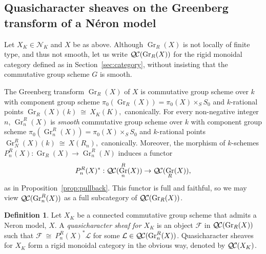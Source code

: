 \documentclass{amsart}
\theoremstyle{plain}
\theoremstyle{definition}
\newtheorem{definition}[theorem]{Definition}
\theoremstyle{remark}
\newcommand{\Fq}{k}
\DeclareMathOperator{\Gr}{Gr}
\newcommand{\iso}{{\ \cong\ }}
\newcommand{\qcs}[1]{{\mathcal{#1}}}
\newcommand{\QC}{{\mathcal{Q\hskip-0.8pt C}}}
\begin{document}
\subsection{Quasicharacter sheaves on the Greenberg transform of a Néron model}
 
Let $X_K \in \mathcal{N}_K$ and $X$ be as above.
Although $\Gr_R(X)$ is not locally of finite type, and thus not smooth, let us write $\QC(\Gr_R(X))$ for the rigid monoidal category defined as in Section~\ref{sec:category}, without insisting that the commutative group scheme $G$ is smooth.

The Greenberg transform $\Gr_R(X)$ of $X$ is commutative group scheme over $\Fq$ with component group scheme
$
\pi_0(\Gr_R(X))= \pi_0(X) \times_S S_0
$
and $\Fq$-rational points
$
\Gr_R(X)(\Fq)\iso X_K(K),
$
canonically.
For every non-negative integer $n$, $\Gr^R_n(X)$ is {\it smooth} commutative group scheme over $\Fq$ with component group scheme
$\pi_0(\Gr^R_n(X))= \pi_0(X) \times_S S_0$
and $\Fq$-rational points
$
\Gr^R_N(X)(\Fq)\iso X(R_n),
$
canonically.
%
Moreover, the morphism of $\Fq$-schemes $P^R_n(X) : \Gr_R(X) \to \Gr^R_n(N)$ induces a functor
\[
P^R_n(X)^* : \QC(\Gr^R_n(X)) \to \QC(\Gr_R(X)),
\]
as in Proposition~\ref{prop:pullback}.
This functor is full and faithful, so we may view $\QC(\Gr^R_n(X))$ as a full subcategory of $\QC(\Gr_R(X))$.

\begin{definition}
Let $X_K$ be a connected commutative group scheme that admits a Neron model, $X$.
A {\it quasicharacter sheaf for $X_K$} is an object $\qcs{F}$ in $\QC(\Gr_R(X))$ such that $\qcs{F} \iso P^R_n(X)^*\qcs{L}$ for some $\qcs{L} \in \QC(\Gr^R_n(X))$.
Quasicharacter sheaves for $X_K$ form a rigid monoidal category in the obvious way, denoted by $\QC(X_K)$.
\end{definition}

\end{document}
